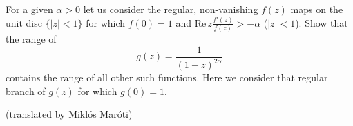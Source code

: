 For a given $\alpha >0$ let us consider the regular, non-vanishing $f(z)$ maps on the unit disc $\{ |z|<1 \}$ for which $f(0)=1$ and $\mathrm{Re}\, z\frac{f'(z)}{f(z)}>-\alpha$ ($|z|<1$). Show that the range of
$$g(z)=\frac{1}{(1-z)^{2\alpha}}$$contains the range of all other such functions. Here we consider that regular branch of $g(z)$ for which $g(0)=1$.

(translated by Miklós Maróti)